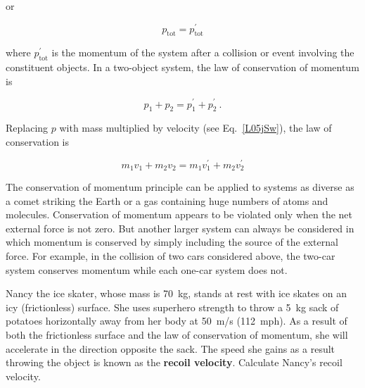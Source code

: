 \documentclass{article}
\numberwithin{equation}{section}
\numberwithin{figure}{section}
\begin{document}
or

\begin{equation}
    p_{\text{tot}} = p_{\text{tot}}^{\prime}
\end{equation}

where $p_{\text{tot}}^{\prime}$ is the momentum of the system after a collision or event involving the constituent objects. In a two-object system, the law of conservation of momentum is

\begin{equation} \label{LgDXpb}
    p_1 + p_2 = p_1^{\prime} + p_2^{\prime}\ .
\end{equation}

Replacing $p$ with mass multiplied by velocity (see Eq.~\ref{L05jSw}), the law of conservation is 

\begin{equation} \label{eVkwoQ}
    m_1 v_1 + m_2 v_2 = m_1 v_1^{\prime} + m_2 v_2^{\prime}
\end{equation}

The conservation of momentum principle can be applied to systems as diverse as a comet striking the Earth or a gas containing huge numbers of atoms and molecules. Conservation of momentum appears to be violated only when the net external force is not zero. But another larger system can always be considered in which momentum is conserved by simply including the source of the external force. For example, in the collision of two cars considered above, the two-car system conserves momentum while each one-car system does not.

\begin{example} \label{W5BnBq} %
    Nancy the ice skater, whose mass is \SI{70}{kg}, stands at rest with ice skates on an icy (frictionless) surface. She uses superhero strength to throw a \SI{5}{kg} sack of potatoes horizontally away from her body at \SI{50}{m/s} (\SI{112}{mph}). As a result of both the frictionless surface and the law of conservation of momentum, she will accelerate in the direction opposite the sack. The speed she gains as a result throwing the object is known as the \textbf{recoil velocity}. Calculate Nancy's recoil velocity.
\end{example}
\end{document}
